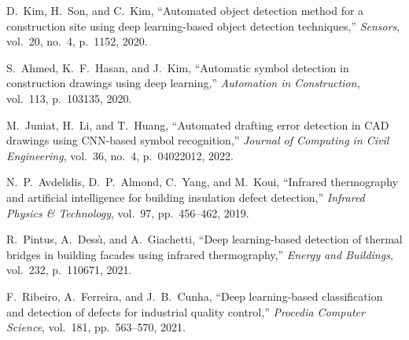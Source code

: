 \documentclass[]{IEEEphot}
\begin{document}
\begin{thebibliography}{00}

D.~Kim, H.~Son, and C.~Kim, ``Automated object detection method for a construction site using deep learning-based object detection techniques,'' \emph{Sensors}, vol.~20, no.~4, p.~1152, 2020.

S.~Ahmed, K.~F.~Hasan, and J.~Kim, ``Automatic symbol detection in construction drawings using deep learning,'' \emph{Automation in Construction}, vol.~113, p.~103135, 2020.

M.~Juniat, H.~Li, and T.~Huang, ``Automated drafting error detection in CAD drawings using CNN-based symbol recognition,'' \emph{Journal of Computing in Civil Engineering}, vol.~36, no.~4, p.~04022012, 2022.

N.~P.~Avdelidis, D.~P.~Almond, C.~Yang, and M.~Koui, ``Infrared thermography and artificial intelligence for building insulation defect detection,'' \emph{Infrared Physics \& Technology}, vol.~97, pp.~456--462, 2019.

R.~Pintus, A.~Dess{\`\i}, and A.~Giachetti, ``Deep learning-based detection of thermal bridges in building facades using infrared thermography,'' \emph{Energy and Buildings}, vol.~232, p.~110671, 2021.

F.~Ribeiro, A.~Ferreira, and J.~B.~Cunha, ``Deep learning-based classification and detection of defects for industrial quality control,'' \emph{Procedia Computer Science}, vol.~181, pp.~563--570, 2021.

\end{thebibliography}
\end{document}
